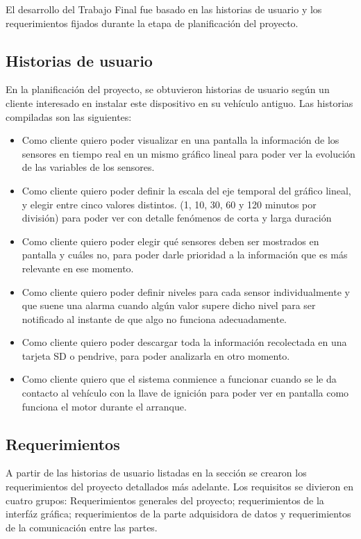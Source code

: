 El desarrollo del Trabajo Final fue basado en las historias de usuario y los requerimientos fijados durante la etapa de planificación del proyecto.

\subsection{Historias de usuario}

En la planificación del proyecto, se obtuvieron historias de usuario según un cliente interesado en instalar este dispositivo en su vehículo antiguo. Las historias compiladas son las siguientes:

\begin{itemize}
\item Como cliente quiero poder visualizar en una pantalla la información de los sensores en tiempo real en un mismo gráfico lineal para poder ver la evolución de las variables de los sensores.
\item Como cliente quiero poder definir la escala del eje temporal del gráfico lineal, y elegir entre cinco valores distintos. (1, 10, 30, 60 y 120 minutos por división) para poder ver con detalle fenómenos de corta y larga duración
\item Como cliente quiero poder elegir qué sensores deben ser mostrados en pantalla y cuáles no, para poder darle prioridad a la información que es más relevante en ese momento.
\item Como cliente quiero poder definir niveles para cada sensor individualmente y que suene una alarma cuando algún valor supere dicho nivel para ser notificado al instante de que algo no funciona adecuadamente.
\item Como cliente quiero poder descargar toda la información recolectada en una tarjeta SD o pendrive, para poder analizarla en otro momento.
\item Como cliente quiero que el sistema conmience a funcionar cuando se le da contacto al vehículo con la llave de ignición para poder ver en pantalla como funciona el motor durante el arranque.
\end{itemize}

\subsection{Requerimientos}

A partir de las historias de usuario listadas en la sección  se crearon los requerimientos del proyecto detallados más adelante. Los requisitos se divieron en cuatro grupos: Requerimientos generales del proyecto; requerimientos de la interfáz gráfica; requerimientos de la parte adquisidora de datos y requerimientos de la comunicación entre las partes.

